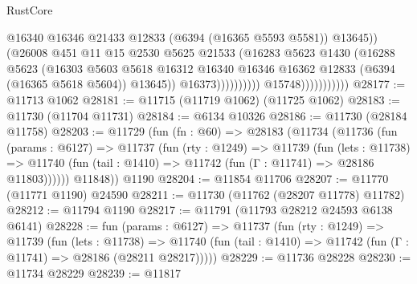 \begin{lexlean}{RustCore}
\begin{coremodule}
                                              @16340
                                              @16346
                                              @21433
                                              @12833
                                              (@6394 (@16365 @5593 @5581))
                                              @13645))
                                          (@26008
                                            @451
                                            @11
                                            @15
                                            @2530
                                            @5625
                                            @21533
                                            (@16283
                                              @5623
                                              @1430
                                              (@16288
                                                @5623
                                                (@16303
                                                  @5603
                                                  @5618
                                                  @16312
                                                  @16340
                                                  @16346
                                                  @16362
                                                  @12833
                                                  (@6394 (@16365 @5618 @5604))
                                                  @13645))
                                              @16373))))))))))
                          @15748)))))))))))
@28177 := @11713 @1062
@28181 := @11715 (@11719 @1062) (@11725 @1062)
@28183 := @11730 (@11704 @11731)
@28184 := @6134 @10326
@28186 := @11730 (@28184 @11758)
@28203 := @11729
    (fun (fn : @60) =>
    @28183
      (@11734
        (@11736
          (fun (params : @6127) =>
          @11737
            (fun (rty : @1249) =>
            @11739
              (fun (lets : @11738) =>
              @11740 (fun (tail : @1410) => @11742 (fun (Γ : @11741) => @28186 @11803))))))
        @11848))
    @1190
@28204 := @11854 @11706
@28207 := @11770 (@11771 @1190) @24590
@28211 := @11730 (@11762 (@28207 @11778) @11782)
@28212 := @11794 @1190
@28217 := @11791 (@11793 @28212 @24593 @6138 @6141)
@28228 := fun (params : @6127) =>
  @11737
    (fun (rty : @1249) =>
    @11739
      (fun (lets : @11738) =>
      @11740 (fun (tail : @1410) => @11742 (fun (Γ : @11741) => @28186 (@28211 @28217)))))
@28229 := @11736 @28228
@28230 := @11734 @28229
@28239 := @11817

\end{coremodule}
\end{lexlean}
